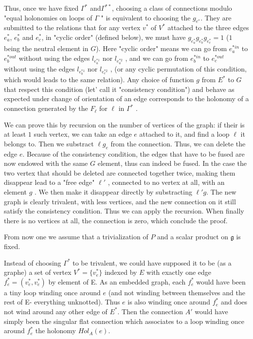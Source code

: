 \documentclass[10pt]{article}
\begin{document}
Thus, once we have fixed $\Gamma^*$ and$\Gamma^{**}$, choosing a class of connections modulo "equal holonomies on loops of $\Gamma$ " is equivalent to choosing the $g_{e^*}$. They are submitted to the relations that for any vertex $v^*$ of $V^*$ attached to the three edges $e^*_a$, $e^*_b$ and $e^*_c$, in "cyclic order" (defined below), we must have $g_{e^*_a}g_{e^*_b}g_{e^*_c}=1$ ($1$ being the neutral element in $G$). Here "cyclic order" means we can go from $e^{*in}_a$ to $e^{*out}_b$ without using the edges $l_{e^{*1}_a}$ nor
 $l_{e^{*2}_a}$ , and we can go from $e^{*in}_b$ to $e^{*out}_c$ without using the edges $l_{e^{*1}_b}$ nor $l_{e^{*2}_c}$ , (or any cyclic permutation of this condition, which would leads to the same relation). Any choice of function $g$ from $E^*$ to $G$ that respect  this condition (let' call it "consistency condition") and behave as expected under change of orientation of an edge corresponds to the holonomy of a connection generated by the $F_\ell$ for $\ell$ in $\Gamma^*$ .%

We can prove this by recursion on the number of vertices of the graph: if their is at least $1$ such vertex, we can take an edge $e$ attached to it, and find a loop $\ell$ it belongs to. Then we substract $\ell g_e$ from the connection. Thus, we can delete the edge $e$. Because of the consistency condition, the edges that have to be fused are now endowed with the same $G$ element, thus can indeed be fused. In the case the two vertex that should be deleted are connected together twice, making them disappear lead to a "free edge"  $\ell'$ , connected to no vertex at all, with an element $g$ . We then make it disappear directly by substracting $\ell' g$. The new graph is clearly trivalent, with less vertices, and the new connection on it still satisfy the consistency condition. Thus we can apply the recursion. When finally there is no vertices at all, the connection is zero, which conclude the proof.


From now one we assume that a trivialization of $P$ and a scalar product on $\mathfrak{g}$ is fixed.

Instead of choosing $\Gamma^*$ to be trivalent, we could have supposed it to be (as a graphe) a set of vertex $V^*=\{v^*_e\}$ indexed by $E$ with exactly one edge $f^*_e=(v^*_e,v^*_e)$ by element of E. As an embedded graph, each $f^*_e$ would have been a tiny loop winding once around $e$ (and not winding between themselves and the rest of E- everything unknotted). Thus $e$ is also winding once around $f^*_e$ and does not wind around any other edge of $E^*$.
Then the connection $A'$ would have simply been the singular flat connection which associates to a loop winding once around $f^*_e$ the holonomy $Hol_A(e)$.
\end{document}
